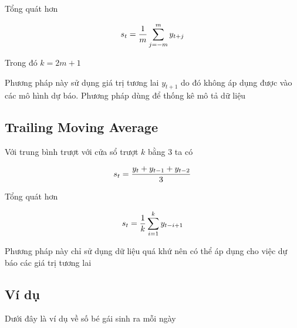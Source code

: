 \documentclass[
]{book}
\begin{document}
Tổng quát hơn

\[\begin{align}
\Large s_{t} = \frac{1}{m}  \sum_{j=-m}^{m}{y_{t+j}}
\end{align}\]

Trong đó \(k = 2m + 1\)

Phương pháp này sử dụng giá trị tương lai \(y_{t+1}\) do đó không áp dụng được vào các mô hình dự báo. Phương pháp dùng để thống kê mô tả dữ liệu

\hypertarget{trailing-moving-average}{%
\subsection{Trailing Moving Average}\label{trailing-moving-average}}

Với trung bình trượt với cửa sổ trượt \(k\) bằng 3 ta có

\[\begin{align}
\Large s_{t} = \frac{y_{t} + y_{t - 1} + y_{t - 2}}{3}
\end{align}\]

Tổng quát hơn

\[\begin{align}
\Large s_{t} = \frac{1}{k} \sum^{k}_{i=1}{y_{t-i+1}}
\end{align}\]

Phương pháp này chỉ sử dụng dữ liệu quá khứ nên có thể áp dụng cho việc dự báo các giá trị tương lai

\hypertarget{vuxed-dux1ee5}{%
\subsection{Ví dụ}\label{vuxed-dux1ee5}}

Dưới đây là ví dụ về số bé gái sinh ra mỗi ngày
\end{document}
